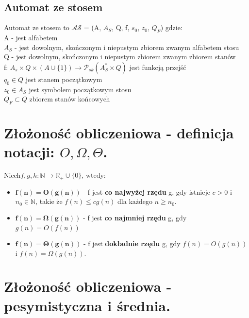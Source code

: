 \documentclass[12pt]{article}
\begin{document}
    \subsection{Automat ze stosem}
    \begin{definition}
    		Automat ze stosem to $\mathcal{AS}$ = (A, $A_{S}$, Q, f, $s_{0}$, $z_{0}$, $Q_{F}$) gdzie: \\
    			A - jest alfabetem \\
    			$A_{S}$ - jest dowolnym, skończonym i niepustym zbiorem zwanym alfabetem stosu \\
    			Q - jest dowolnym, skończonym i niepustym zbiorem zwanym zbiorem stanów \\
    			f: $A_{s} \times Q \times (A \cup \{1\}) \rightarrow \mathcal{P}_{sk}(A^{*}_{S} \times Q)$ jest funkcją przejść \\
    			$q_{0} \in Q$ jest stanem początkowym \\
    			$z_{0} \in A_{S}$ jest symbolem początkowym stosu \\
    			$Q_{F} \subset Q$ zbiorem stanów końcowych
    \end{definition}

    \newpage

    \section{Złożoność obliczeniowa - definicja notacji: $O, \Omega, \Theta$.}
    \begin{definition}
        Niech$f, g, h: \mathbb{N} \rightarrow \mathbb{R}_{+} \cup \{0\}$, wtedy:
        \begin{itemize}
            \item $\mathbf{f(n) = O(g(n))}$ - f jest \textbf{co najwyżej rzędu} g, gdy istnieje $c > 0$ i
            $n_0 \in \mathbb{N}$, takie że $f(n)  \leq cg(n)$ dla każdego $n \geq n_0$.
            \item $\mathbf{f(n) = \Omega(g(n))}$ - f jest \textbf{co najmniej rzędu} g, gdy $g(n) = O(f(n))$
            \item $\mathbf{f(n) = \Theta(g(n))}$ - f jest \textbf{dokładnie rzędu} g, gdy $f(n) = O(g(n))$
            i $f(n) = \Omega(g(n))$.
        \end{itemize}
    \end{definition}

    \newpage

    \section{Złożoność obliczeniowa - pesymistyczna i średnia.}
\end{document}
